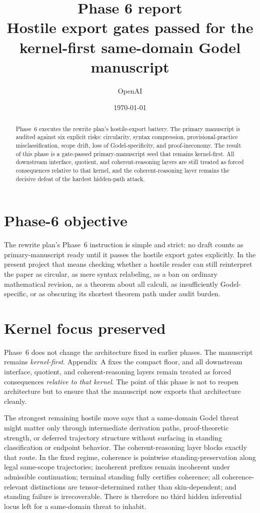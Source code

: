 \documentclass[11pt]{article}
\title{Phase 6 report\\\large Hostile export gates passed for the kernel-first same-domain Godel manuscript}
\author{OpenAI}
\date{\today}
\begin{document}
\maketitle

\begin{abstract}
Phase~6 executes the rewrite plan's hostile-export battery. The primary manuscript is audited against six explicit risks: circularity, syntax compression, provisional-practice misclassification, scope drift, loss of Godel-specificity, and proof-ineconomy. The result of this phase is a gate-passed primary-manuscript seed that remains kernel-first. All downstream interface, quotient, and coherent-reasoning layers are still treated as forced consequences relative to that kernel, and the coherent-reasoning layer remains the decisive defeat of the hardest hidden-path attack.
\end{abstract}

\section{Phase-6 objective}
The rewrite plan's Phase~6 instruction is simple and strict: no draft counts as primary-manuscript ready until it passes the hostile export gates explicitly. In the present project that means checking whether a hostile reader can still reinterpret the paper as circular, as mere syntax relabeling, as a ban on ordinary mathematical revision, as a theorem about all calculi, as insufficiently Godel-specific, or as obscuring its shortest theorem path under audit burden.

\section{Kernel focus preserved}
Phase~6 does not change the architecture fixed in earlier phases. The manuscript remains \emph{kernel-first}. Appendix~A fixes the compact floor, and all downstream interface, quotient, and coherent-reasoning layers remain treated as forced consequences \emph{relative to that kernel}. The point of this phase is not to reopen architecture but to ensure that the manuscript now exports that architecture cleanly.

\begin{tcolorbox}[title=Hardest hostile attack closed]
The strongest remaining hostile move says that a same-domain Godel threat might matter only through intermediate derivation paths, proof-theoretic strength, or deferred trajectory structure without surfacing in standing classification or endpoint behavior. The coherent-reasoning layer blocks exactly that route. In the fixed regime, coherence is pointwise standing-preservation along legal same-scope trajectories; incoherent prefixes remain incoherent under admissible continuation; terminal standing fully certifies coherence; all coherence-relevant distinctions are tensor-determined rather than skin-dependent; and standing failure is irrecoverable. There is therefore no third hidden inferential locus left for a same-domain threat to inhabit.
\end{tcolorbox}
\end{document}
